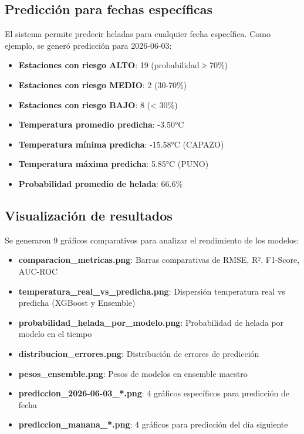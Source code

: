 \documentclass[11pt, a4paper]{article}
\begin{document}
\subsection{Predicción para fechas específicas}

El sistema permite predecir heladas para cualquier fecha específica. Como ejemplo, se generó predicción para 2026-06-03:

\begin{itemize}
    \item \textbf{Estaciones con riesgo ALTO}: 19 (probabilidad ≥ 70\%)
    \item \textbf{Estaciones con riesgo MEDIO}: 2 (30-70\%)
    \item \textbf{Estaciones con riesgo BAJO}: 8 (< 30\%)
    \item \textbf{Temperatura promedio predicha}: -3.50°C
    \item \textbf{Temperatura mínima predicha}: -15.58°C (CAPAZO)
    \item \textbf{Temperatura máxima predicha}: 5.85°C (PUNO)
    \item \textbf{Probabilidad promedio de helada}: 66.6\%
\end{itemize}

\subsection{Visualización de resultados}

Se generaron 9 gráficos comparativos para analizar el rendimiento de los modelos:

\begin{itemize}
    \item \textbf{comparacion\_metricas.png}: Barras comparativas de RMSE, R², F1-Score, AUC-ROC
    \item \textbf{temperatura\_real\_vs\_predicha.png}: Dispersión temperatura real vs predicha (XGBoost y Ensemble)
    \item \textbf{probabilidad\_helada\_por\_modelo.png}: Probabilidad de helada por modelo en el tiempo
    \item \textbf{distribucion\_errores.png}: Distribución de errores de predicción
    \item \textbf{pesos\_ensemble.png}: Pesos de modelos en ensemble maestro
    \item \textbf{prediccion\_2026-06-03\_*.png}: 4 gráficos específicos para predicción de fecha
    \item \textbf{prediccion\_manana\_*.png}: 4 gráficos para predicción del día siguiente
\end{itemize}
\end{document}
